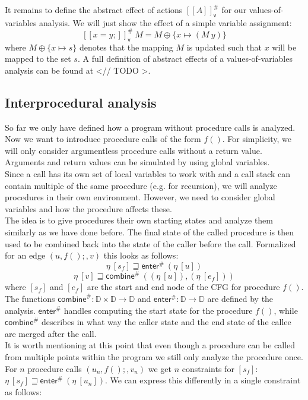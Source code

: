     It remains to define the abstract effect of actions $[\![A]\!]^{\#}_\textsf{v}$ for our values-of-variables analysis. We will just show the effect of a simple variable assignment:
    \[ [\![ x=y; ]\!]^{\#}_\textsf{v}\ M = M \oplus \{x \mapsto (M\ y) \} \]
    where $M \oplus \{x \mapsto s\}$ denotes that the mapping $M$ is updated such that $x$ will be mapped to the set $s$. A full definition of abstract effects of a values-of-variables analysis can be found at <// TODO >.\\

    \subsection{Interprocedural analysis}
    So far we only have defined how a program without procedure calls is analyzed. Now we want to introduce procedure calls of the form $f()$. For simplicity, we will only consider argumentless procedure calls without a return value. Arguments and return values can be simulated by using global variables.\\
    Since a call has its own set of local variables to work with and a call stack can contain multiple of the same procedure (e.g. for recursion), we will analyze procedures in their own environment. However, we need to consider global variables and how the procedure affects these.\\
    The idea is to give procedures their own starting states and analyze them similarly as we have done before. The final state of the called procedure is then used to be combined back into the state of the caller before the call. Formalized for an edge $(u, f();, v)$ this looks as follows:
    \[\eta\ [s_f] \sqsupseteq \textsf{enter}^{\#}\ (\eta\ [u]) \]
    \[\eta\ [v] \sqsupseteq  \textsf{combine}^{\#}\ ((\eta\ [u]), (\eta\ [e_f])) \]
    where $[s_f]$ and $[e_f]$ are the start and end node of the \ac{CFG} for procedure $f()$. The functions $\textsf{combine}^{\#}: \mathbb{D} \times \mathbb{D} \rightarrow \mathbb{D}$ and $\textsf{enter}^{\#}: \mathbb{D} \rightarrow \mathbb{D}$ are defined by the analysis. $\textsf{enter}^{\#}$ handles computing the start state for the procedure $f()$, while $\textsf{combine}^{\#}$ describes in what way the caller state and the end state of the callee are merged after the call.\\
    It is worth mentioning at this point that even though a procedure can be called from multiple points within the program we still only analyze the procedure once. For $n$ procedure calls $(u_n, f();, v_n)$ we get $n$ constraints for $[s_f]$: $\eta\ [s_f] \sqsupseteq \textsf{enter}^{\#}\ (\eta\ [u_n])$. We can express this differently in a single constraint as follows:
